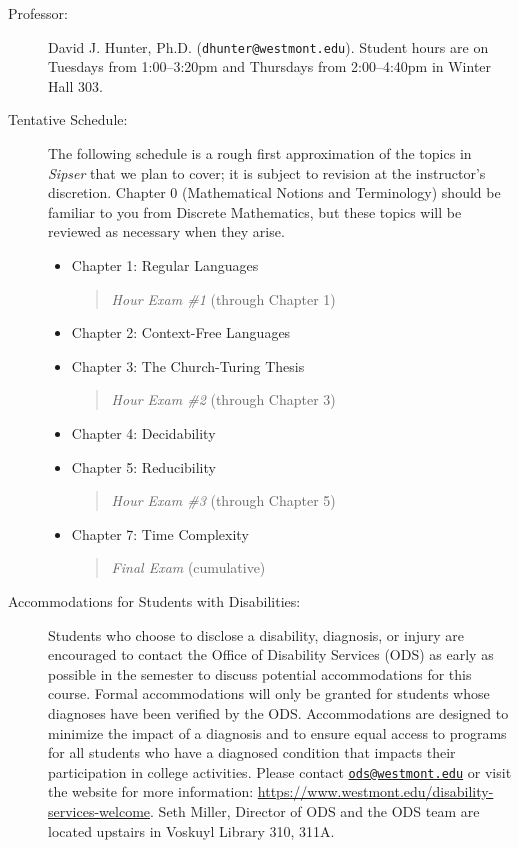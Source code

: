 \documentclass[
  twoside]{article}
\begin{document}
\begin{description} 

\item[Professor:] David J. Hunter, Ph.D.
  (\verb!dhunter@westmont.edu!). Student hours are on Tuesdays from 1:00--3:20pm and Thursdays from 2:00--4:40pm in Winter Hall 303.

 \item[Tentative Schedule:] The following schedule is a rough first approximation of the topics in \textit{Sipser} that we plan to cover; it is subject to revision at the instructor's discretion. Chapter 0 (Mathematical Notions and Terminology) should be familiar to you from Discrete Mathematics, but these topics will be reviewed as necessary when they arise.
  \begin{itemize}[noitemsep]
      \item Chapter 1: Regular Languages
         \begin{quote}
          \textit{Hour Exam \#1}     (through Chapter 1)
         \end{quote}
      \item Chapter 2: Context-Free Languages
      \item Chapter 3: The Church-Turing Thesis
         \begin{quote}
          \textit{Hour Exam \#2}     (through Chapter 3)
         \end{quote}
      \item Chapter 4: Decidability
      \item Chapter 5: Reducibility
         \begin{quote}
          \textit{Hour Exam \#3}     (through Chapter 5)
         \end{quote}
      \item Chapter 7: Time Complexity 
   \begin{quote}
    \textit{Final Exam}     (cumulative)
   \end{quote}
  \end{itemize}

\item[Accommodations for Students with Disabilities:] Students who choose to disclose a disability, diagnosis, or injury are encouraged to contact the Office of Disability Services (ODS) as early as possible in the semester to discuss potential accommodations for this course. Formal accommodations will only be granted for students whose diagnoses have been verified by the ODS. Accommodations are designed to minimize the impact of a diagnosis and to ensure equal access to programs for all students who have a diagnosed condition that impacts their participation in college activities. Please contact \href{mailto:ods@westmont.edu}{\tt ods@westmont.edu} or visit the website for more information: \url{https://www.westmont.edu/disability-services-welcome}. Seth Miller, Director of ODS and the ODS team are located upstairs in Voskuyl Library 310, 311A. 


\end{description}
\end{document}
